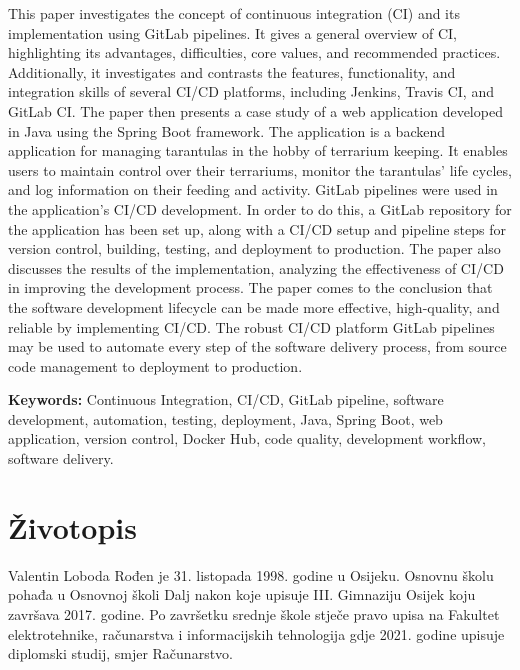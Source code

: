\documentclass[a4paper,12pt,oneside]{article}
\begin{document}
This paper investigates the concept of continuous integration (CI) and its implementation using GitLab pipelines.  It gives a general overview of CI, highlighting its advantages, difficulties, core values, and recommended practices. Additionally, it investigates and contrasts the features, functionality, and integration skills of several CI/CD platforms, including Jenkins, Travis CI, and GitLab CI. The paper then presents a case study of a web application developed in Java using the Spring Boot framework. The application is a backend application for managing tarantulas in the hobby of terrarium keeping.  It enables users to maintain control over their terrariums, monitor the tarantulas' life cycles, and log information on their feeding and activity. GitLab pipelines were used in the application's CI/CD development. In order to do this, a GitLab repository for the application has been set up, along with a CI/CD setup and pipeline steps for version control, building, testing, and deployment to production. The paper also discusses the results of the implementation, analyzing the effectiveness of CI/CD in improving the development process. The paper comes to the conclusion that the software development lifecycle can be made more effective, high-quality, and reliable by implementing CI/CD. The robust CI/CD platform GitLab pipelines may be used to automate every step of the software delivery process, from source code management to deployment to production. 

\bigskip
\noindent\textbf{Keywords:}  Continuous Integration, CI/CD, GitLab pipeline, software development, automation, testing, deployment, Java, Spring Boot, web application, version control, Docker Hub, code quality, development workflow, software delivery.

\newpage

\printbibliography[heading=bibintoc]

\newpage
\section*{Životopis}

Valentin Loboda Rođen je 31. listopada 1998. godine u Osijeku. Osnovnu školu pohađa u 
Osnovnoj školi Dalj nakon koje upisuje III. Gimnaziju Osijek koju završava 2017. godine. Po 
završetku srednje škole stječe pravo upisa na Fakultet elektrotehnike, računarstva i informacijskih 
tehnologija gdje 2021. godine upisuje diplomski studij, smjer Računarstvo.
\end{document}

